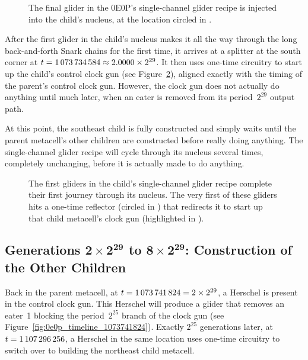 \begin{figure}[!htb]
	\centering
	\caption{The final glider in the 0E0P's single-channel glider recipe is injected into the child's nucleus, at the location circled in .}
	\label{fig:0e0p_timeline_974368517}
\end{figure}

After the first glider in the child's nucleus makes it all the way through the long back-and-forth Snark chains for the first time, it arrives at a splitter at the south corner at $t = 1{\,}073{\,}734{\,}584 \approx 2.0000 \times 2^{29}$. It then uses one-time circuitry to start up the child's control clock gun (see Figure~\ref{fig:0e0p_timeline_1073734584}), aligned exactly with the timing of the parent's control clock gun. However, the clock gun does not actually do anything until much later, when an eater is removed from its period~$2^{29}$ output path.

At this point, the southeast child is fully constructed and simply waits until the parent metacell's other children are constructed before really doing anything. The single-channel glider recipe will cycle through its nucleus several times, completely unchanging, before it is actually made to do anything.

\begin{figure}[!htb]
	\centering
	\caption{The first gliders in the child's single-channel glider recipe complete their first journey through its nucleus. The very first of these gliders hits a one-time reflector (circled in ) that redirects it to start up that child metacell's clock gun (highlighted in ).}
	\label{fig:0e0p_timeline_1073734584}
\end{figure}


\subsection{Generations $\mathbf{2 \times 2^{29}}$ to $\mathbf{8 \times 2^{29}}$: Construction of the Other Children}\label{sec:0e0p_timeline_other_child}

Back in the parent metacell, at $t = 1{\,}073{\,}741{\,}824 = 2 \times 2^{29}$, a Herschel is present in the control clock gun. This Herschel will produce a glider that removes an eater~1 blocking the period~$2^{25}$ branch of the clock gun (see Figure~\ref{fig:0e0p_timeline_1073741824}). Exactly $2^{25}$ generations later, at $t = 1{\,}107{\,}296{\,}256$, a Herschel in the same location uses one-time circuitry to switch over to building the northeast child metacell.

